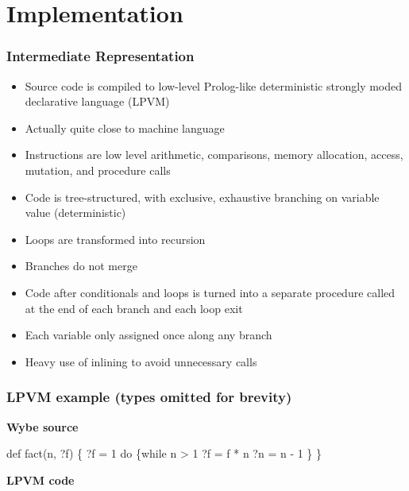 \documentclass[12pt]{beamer}
\begin{document}
\section{Implementation}

\begin{frame}[fragile]
\frametitle{Intermediate Representation}
\begin{itemize}
\item Source code is compiled to low-level Prolog-like deterministic
  strongly moded declarative language (LPVM)
\item Actually quite close to machine language
\item Instructions are low level arithmetic, comparisons, memory allocation,
  access, mutation, and procedure calls
\item Code is tree-structured, with exclusive, exhaustive branching on variable
  value (deterministic)
\item Loops are transformed into recursion
\item Branches do not merge
\item Code after conditionals and loops is turned into a separate procedure
  called at the end of each branch and each loop exit
\item Each variable only assigned once along any branch
\item Heavy use of inlining to avoid unnecessary calls
\end{itemize}
\end{frame}


\begin{frame}[fragile]
  \frametitle{LPVM example (types omitted for brevity)}
  \begin{minipage}{.35\linewidth}
\centerline{\textbf{Wybe source}}
\begin{semiverbatim}
def fact(n, ?f) \{
    ?f = 1
    do \{while n > 1
        ?f = f * n
        ?n = n - 1
    \}
\}
\end{semiverbatim}
  \end{minipage}
\qquad
  \begin{minipage}{.55\linewidth}
\centerline{\textbf{LPVM code}}
  \end{minipage}
\end{frame}
\end{document}
